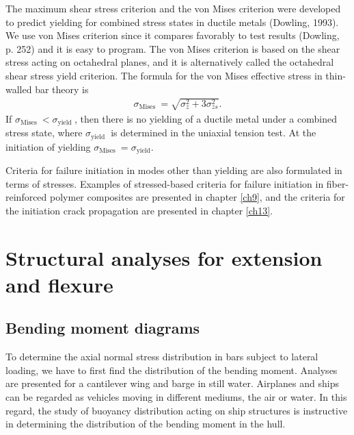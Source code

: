 \documentclass{AeroStructure-ERJohnson}
\begin{document}
The maximum shear stress criterion and the von Mises criterion were developed to predict yielding for combined stress states in ductile metals (Dowling, 1993). We use von Mises criterion since it compares favorably to test results (Dowling, p. 252) and it is easy to program. The von Mises criterion is based on the shear stress acting on octahedral planes, and it is alternatively called the octahedral shear stress yield criterion. The formula for the von Mises effective stress in thin-walled bar theory is
\begin{align}\label{eq4.31}
\sigma_{\textrm{Mises }}=\sqrt{\sigma_{z}^{2}+3 \sigma_{z s}^{2}}.
\end{align}
If $\sigma_{\textrm{Mises }}<\sigma_{\textrm{yield }}$, then there is no yielding of a ductile metal under a combined stress state, where $\sigma_{\textrm{yield }}$ is determined in the uniaxial tension test. At the initiation of yielding $\sigma_{\textrm{Mises }}=\sigma_{\textrm{yield}}$.

Criteria for failure initiation in modes other than yielding are also formulated in terms of stresses. Examples of stressed-based criteria for failure initiation in fiber-reinforced polymer composites are presented in chapter \ref{ch9}, and the criteria for the initiation crack propagation are presented in chapter \ref{ch13}.

\pagebreak

\section{Structural analyses for extension and flexure}\label{sec4.3}

\subsection{Bending moment diagrams}\label{sec4.3.1}

To determine the axial normal stress distribution in bars subject to lateral loading, we have to first find the distribution of the bending moment. Analyses are presented for a cantilever wing and barge in still water. Airplanes and ships can be regarded as vehicles moving in different mediums, the air or water. In this regard, the study of buoyancy distribution acting on ship structures is instructive in determining the distribution of the bending moment in the hull.
\end{document}
